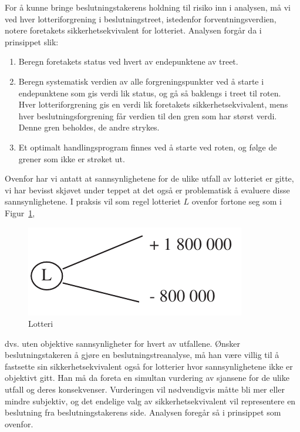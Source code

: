 {{For å kunne bringe beslutningstakerens holdning til risiko inn i 
analysen, må vi ved hver lotteriforgrening i beslutningstreet,
istedenfor forventningsverdien, notere foretakets sikkerhetsekvivalent for
lotteriet.  Analysen forgår da i prinsippet slik:

\begin{enumerate}
\item Beregn foretakets status ved hvert av endepunktene av treet.
\item Beregn systematisk verdien av alle forgreningspunkter ved å
      starte i endepunktene som gis verdi lik status, og gå så
      baklengs i treet til roten.  Hver lotteriforgrening gis en verdi lik
      foretakets sikkerhetsekvivalent, mens hver beslutningsforgrening
      får verdien til den gren som har størst verdi. Denne gren 
      beholdes, de andre strykes.
\item Et optimalt handlingsprogram finnes ved å starte ved roten, og
      følge de grener som ikke er strøket ut.
\end {enumerate}
Ovenfor har vi antatt at sannsynlighetene for de ulike utfall av lotteriet
er gitte, vi har bevisst skjøvet under teppet at det også er 
problematisk å evaluere disse sannsynlighetene.  I praksis vil som 
regel lotteriet $L$ ovenfor fortone seg som i Figur~\ref{fig:lotteri3},

\begin{figure}[ht]
\centering
	\includegraphics[scale=1.0]{figurer/fig16_7.pdf} 
\caption{Lotteri}
	\label{fig:lotteri3}
\end{figure}
\noindent dvs. uten objektive sannsynligheter for hvert av utfallene. Ønsker 
beslutningstakeren å gjøre en beslutningstreanalyse, må han
være villig til å fastsette sin sikkerhetsekvivalent også for
lotterier hvor sannsynlighetene ikke er objektivt gitt.  Han må da
foreta en simultan vurdering av sjansene for de ulike utfall og deres 
konsekvenser.  Vurderingen vil nødvendigvis måtte bli mer eller
mindre subjektiv, og det endelige valg av sikkerhetsekvivalent vil
representere en beslutning fra beslutningstakerens side.  Analysen foregår
så i prinsippet som ovenfor.

}}
